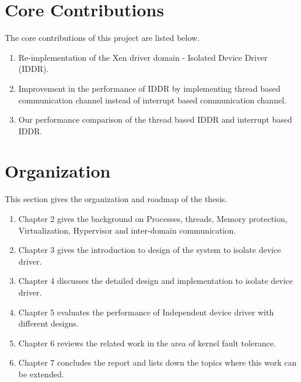 \section{Core Contributions}
The core contributions of this project are listed below. 
\begin{enumerate}
\item Re-implementation of the Xen driver domain - Isolated Device Driver (IDDR).
\item Improvement in the performance of IDDR by implementing thread based communication channel instead of interrupt based communication channel. 
\item Our performance comparison of the thread based IDDR and interrupt based IDDR.
\end{enumerate}
\section {Organization}
This section gives the organization and roadmap of the thesis.
\begin{enumerate}
\item Chapter 2 gives the background on Processes, threads, Memory protection, Virtualization, Hypervisor and inter-domain communication.
\item Chapter 3 gives the introduction to design of the system to isolate device driver. 
\item Chapter 4 discusses the detailed design and implementation to isolate device driver. 
\item Chapter 5 evaluates the performance of Independent device driver with different designs.
\item Chapter 6 reviews the related work in the area of kernel fault tolerance.
\item Chapter 7 concludes the report and lists down the topics where this work can be extended.
\end{enumerate}
\pagebreak
{}
